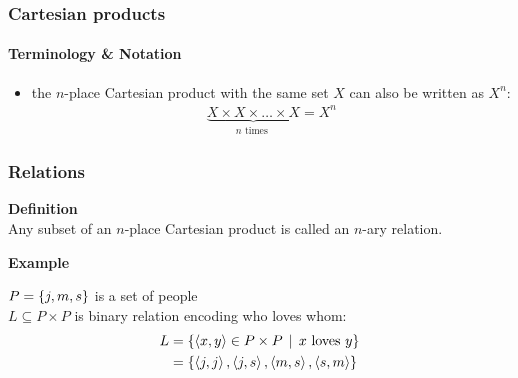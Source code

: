 \documentclass[fleqn,10pt,serif,xcolor=svgnames,xcolor=table,aspectratio=169,handout]{beamer}
\begin{document}
\begin{frame}
  \frametitle{Cartesian products}
  \framesubtitle{Terminology \& Notation}

  \begin{itemize}
    \item the $n$-place Cartesian product with the same set $X$ can also be written as $X^{n}$:
    \begin{align*}
      \underbrace{X \times X \times \dots \times X} _{n \text{ times }}= X^{n}
    \end{align*}
  \end{itemize}

\end{frame}

\begin{frame}
  \frametitle{Relations}

  \textbf{{\color{themecolor}Definition}}\\
  Any subset of an $n$-place Cartesian product is called an $n$-ary relation.

  \bigskip

  \textbf{{\color{themecolor}Example}}\\
  \begin{minipage}{0.65\linewidth}
    $P = \left\{j,m,s\right\}$ is a set of people\\
    $L \subseteq P \times P$ is binary relation encoding who loves whom:
    \begin{align*}
      L & = \left\{\left \langle x,y\right\rangle \in P \times P \thinspace \mid \thinspace \text{$x$ loves $y$}\right\} \\
        & = \left\{\left \langle j,j\right\rangle, \left \langle j,s\right\rangle, \left \langle m,s\right\rangle, \left \langle s,m\right\rangle\right\}
    \end{align*}
  \end{minipage}
  \hfill
  \begin{minipage}{0.3\linewidth}
    \begin{center}
    \end{center}
  \end{minipage}

\end{frame}
\end{document}

